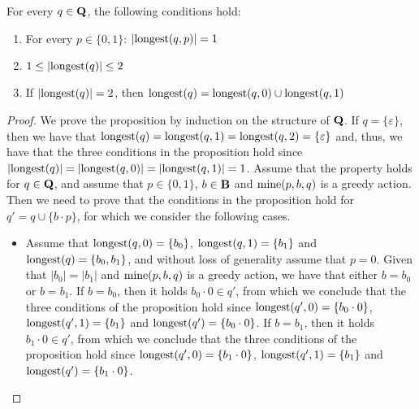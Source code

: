 \begin{myprop}\label{prop-length-greedy}
For every $q \in \mathbf{Q}$, the following conditions hold:
\begin{enumerate}
\item For every $p \in \{0,1\}$: $|{\text{\rm longest}}(q,p)| = 1$ 

\item $1 \leq |{\text{\rm longest}}(q)| \leq 2$

\item If $|{\text{\rm longest}}(q)| = 2$, then ${\text{\rm longest}}(q) = {\text{\rm longest}}(q,0) \cup {\text{\rm longest}}(q,1)$
\end{enumerate}
\end{myprop}

\begin{proof}
We prove the proposition by induction on the structure of $\mathbf{Q}$. If $q = \{ \varepsilon \}$, then we have that ${\text{\rm longest}}(q) = {\text{\rm longest}}(q,1) = {\text{\rm longest}}(q,2) = \{ \varepsilon \}$ and, thus, we have that  the three conditions in the proposition hold since $|{\text{\rm longest}}(q)| = |{\text{\rm longest}}(q,0)| = |{\text{\rm longest}}(q,1)| = 1$. Assume that the property holds for $q \in \mathbf{Q}$, and assume that $p \in \{0,1\}$, $b \in \mathbf{B}$ and $\text{\rm mine}(p,b,q)$ is a greedy action. Then we need to prove that the conditions in the proposition hold for $q ' = q \cup \{b \cdot p \}$, for which we consider the following cases.
\begin{itemize}
\item Assume that ${\text{\rm longest}}(q,0) = \{b_0\}$,  ${\text{\rm longest}}(q, 1) = \{b_1\}$ and ${\text{\rm longest}}(q) = \{b_0,b_1\}$, and without loss of generality assume that $p = 0$. Given that $|b_0| = |b_1|$ and $\text{\rm mine}(p,b,q)$ is a greedy action, we have that either $b = b_0$ or $b = b_1$. If $b = b_0$, then it holds $b_0 \cdot 0 \in q'$, from which we conclude that the three conditions of the proposition hold since ${\text{\rm longest}}(q',0) = \{b_0 \cdot 0\}$, ${\text{\rm longest}}(q',1) = \{b_1\}$ and ${\text{\rm longest}}(q') = \{b_0 \cdot 0\}$.  If $b = b_1$, then it holds $b_1 \cdot 0 \in q'$, from which we conclude that the three conditions of the proposition hold since ${\text{\rm longest}}(q',0) = \{b_1 \cdot 0\}$, ${\text{\rm longest}}(q',1) = \{b_1\}$ and ${\text{\rm longest}}(q') = \{b_1 \cdot 0\}$.


\end{itemize}
\end{proof}
